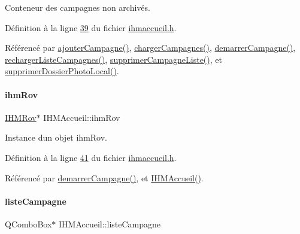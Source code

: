 Conteneur des campagnes non archivés. 



Définition à la ligne \hyperlink{ihmaccueil_8h_source_l00039}{39} du fichier \hyperlink{ihmaccueil_8h_source}{ihmaccueil.\+h}.



Référencé par \hyperlink{ihmaccueil_8cpp_source_l00254}{ajouter\+Campagne()}, \hyperlink{ihmaccueil_8cpp_source_l00130}{charger\+Campagnes()}, \hyperlink{ihmaccueil_8cpp_source_l00323}{demarrer\+Campagne()}, \hyperlink{ihmaccueil_8cpp_source_l00092}{recharger\+Liste\+Campagnes()}, \hyperlink{ihmaccueil_8cpp_source_l00189}{supprimer\+Campagne\+Liste()}, et \hyperlink{ihmaccueil_8cpp_source_l00234}{supprimer\+Dossier\+Photo\+Local()}.

\mbox{\label{class_i_h_m_accueil_af9f2613056b21bdf82e8f54a26146acc}} 
\paragraph{\texorpdfstring{ihm\+Rov}{ihmRov}}
{\footnotesize\ttfamily \hyperlink{class_i_h_m_rov}{I\+H\+M\+Rov}$\ast$ I\+H\+M\+Accueil\+::ihm\+Rov\hspace{0.3cm}{\ttfamily [private]}}



Instance d\textquotesingle{}un objet ihm\+Rov. 



Définition à la ligne \hyperlink{ihmaccueil_8h_source_l00041}{41} du fichier \hyperlink{ihmaccueil_8h_source}{ihmaccueil.\+h}.



Référencé par \hyperlink{ihmaccueil_8cpp_source_l00323}{demarrer\+Campagne()}, et \hyperlink{ihmaccueil_8cpp_source_l00014}{I\+H\+M\+Accueil()}.

\mbox{\label{class_i_h_m_accueil_afb828a4e06c25afa40341c310cd85b08}} 
\paragraph{\texorpdfstring{liste\+Campagne}{listeCampagne}}
{\footnotesize\ttfamily Q\+Combo\+Box$\ast$ I\+H\+M\+Accueil\+::liste\+Campagne\hspace{0.3cm}{\ttfamily [private]}}



